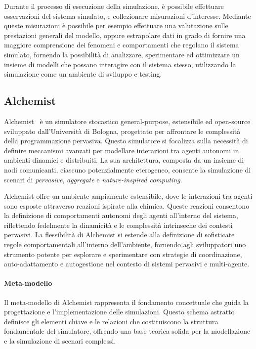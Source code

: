Durante il processo di esecuzione della simulazione, è possibile effettuare osservazioni del sistema simulato, e collezionare misurazioni d'interesse.
Mediante queste misurazioni è possibile per esempio effettuare una valutazione sulle prestazioni generali del modello, oppure estrapolare dati
in grado di fornire una maggiore comprensione dei fenomeni e comportamenti che regolano il sistema simulato, fornendo la possibilità di analizzare,
sperimentare ed ottimizzare un insieme di modelli che possano interagire con il sistema stesso, utilizzando la simulazione come un ambiente di sviluppo e testing.

\subsection{Alchemist}\label{ssec:alchemist}
Alchemist~\cite{alchemist} è un simulatore stocastico general-purpose, estensibile ed open-source sviluppato dall'Università di Bologna, progettato
per affrontare le complessità della programmazione pervasiva. Questo simulatore si focalizza sulla necessità di definire meccanismi avanzati per modellare
interazioni tra agenti autonomi in ambienti dinamici e distribuiti. La sua architettura, composta da un insieme di nodi comunicanti, ciascuno
potenzialmente eterogeneo, consente la simulazione di scenari di \textit{pervasive}, \textit{aggregate} e \textit{nature-inspired computing}.

Alchemist offre un ambiente ampiamente estensibile, dove le interazioni tra agenti sono esposte attraverso reazioni ispirate alla chimica. Queste reazioni
consentono la definizione di comportamenti autonomi degli agenti all'interno del sistema, riflettendo fedelmente la dinamicità e le complessità intrinseche
dei contesti pervasivi. La flessibilità di Alchemist si estende alla definizione di sofisticate regole comportamentali all'interno dell'ambiente,
fornendo agli sviluppatori uno strumento potente per esplorare e sperimentare con strategie di coordinazione, auto-adattamento e autogestione nel contesto di
sistemi pervasivi e multi-agente.

\paragraph{Meta-modello} Il meta-modello di Alchemist rappresenta il fondamento concettuale che guida la progettazione e l'implementazione delle simulazioni. Questo
schema astratto definisce gli elementi chiave e le relazioni che costituiscono la struttura fondamentale del simulatore, offrendo una base teorica solida per
la modellazione e la simulazione di scenari complessi.

